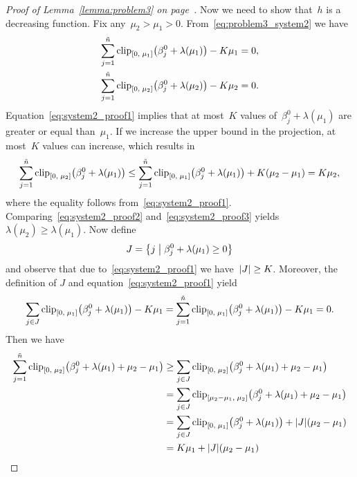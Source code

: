 \begin{proof}[Proof of Lemma~\ref{lemma:problem3} on page~\pageref{lemma:problem3}]
  Now we need to show that~$h$ is a decreasing function. Fix any~$\mu_2 > \mu_1 > 0$. From~\eqref{eq:problem3_system2} we have
  \begin{align}
   \sum_{j=1}^{\ntil} \clip{0}{\mu_1}{\beta_j^0 + \lambda(\mu_1)} - K \mu_1 & = 0,
    \label{eq:system2_proof1} \\
  \sum_{j=1}^{\ntil} \clip{0}{\mu_2}{\beta_j^0 + \lambda(\mu_2)} - K \mu_2 & = 0.
    \label{eq:system2_proof2}
  \end{align}
  Equation~\eqref{eq:system2_proof1} implies that at most~$K$ values of~$\beta_j^0 + \lambda(\mu_1)$ are greater or equal than~$\mu_1$. If we increase the upper bound in the projection, at most~$K$ values can increase, which results in
  \begin{equation}\label{eq:system2_proof3}
    \sum_{j=1}^{\ntil} \clip{0}{\mu_2}{\beta_j^0 + \lambda(\mu_1)}
      \le \sum_{j=1}^{\ntil} \clip{0}{\mu_1}{\beta_j^0 + \lambda(\mu_1)} + K(\mu_2 - \mu_1)
      = K \mu_2,
  \end{equation}
  where the equality follows from~\eqref{eq:system2_proof1}. Comparing~\eqref{eq:system2_proof2} and~\eqref{eq:system2_proof3} yields~$\lambda(\mu_2) \ge \lambda(\mu_1)$. Now define
  \begin{equation*}
    J = \Set{j}{\beta_j^0 + \lambda(\mu_1) \ge 0}
  \end{equation*}
  and observe that due to~\eqref{eq:system2_proof1} we have~$|J| \ge K$. Moreover, the definition of $J$ and equation~\eqref{eq:system2_proof1} yield
  \begin{equation}\label{eq:system2_proof4}
    \sum_{j \in J} \clip{0}{\mu_1}{\beta_j^0 + \lambda(\mu_1)} - K\mu_1
      = \sum_{j=1}^{\ntil} \clip{0}{\mu_1}{\beta_j^0 + \lambda(\mu_1)} - K\mu_1
      = 0.
  \end{equation}
  Then we have
  \begin{equation}\label{eq:system2_proof5}
    \begin{aligned}
      \sum_{j=1}^{\ntil} \clip{0}{\mu_2}{\beta_j^0 + \lambda(\mu_1) + \mu_2 - \mu_1}
        & \ge \sum_{j \in J} \clip{0}{\mu_2}{\beta_j^0 + \lambda(\mu_1) + \mu_2 - \mu_1} \\
        & = \sum_{j \in J} \clip{\mu_2 - \mu_1}{\mu_2}{\beta_j^0 + \lambda(\mu_1) + \mu_2 - \mu_1} \\
        & = \sum_{j \in J} \clip{0}{\mu_1}{\beta_j^0 + \lambda(\mu_1)} + \abs{J}(\mu_2 - \mu_1) \\
        & = K\mu_1 + \abs{J}(\mu_2 - \mu_1) \\

\end{aligned}
\end{equation}
\end{proof}
